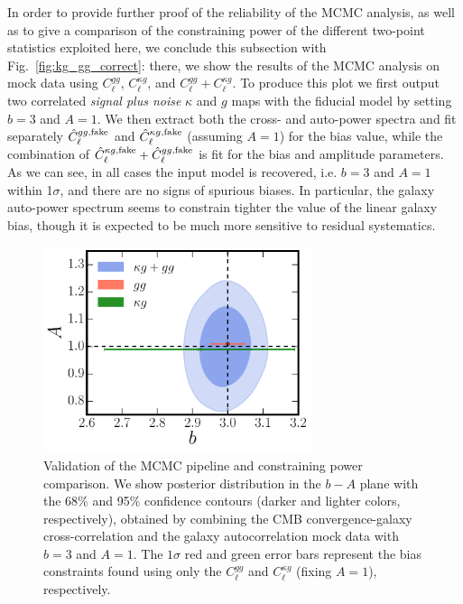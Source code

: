 In order to provide further proof of the reliability of the MCMC analysis, as well as to give a comparison of the constraining power of the different two-point statistics exploited here, we conclude this subsection with Fig.~\eqref{fig:kg_gg_correct}: there, we show the results of the MCMC analysis on mock data using $C_{\ell}^{gg}$, $C_{\ell}^{\kappa g}$, and $C_{\ell}^{gg} + C_{\ell}^{\kappa g}$. To produce this plot we first output two correlated \textit{signal plus noise} $\kappa$ and $g$ maps with the fiducial model by setting $b=3$  and $A=1$. We then extract both the cross- and auto-power spectra and fit separately $\hat{C}_{\ell}^{gg, \rm{fake}}$ and $\hat{C}_{\ell}^{\kappa g, \rm{fake}}$ (assuming $A=1$) for the bias value, while the combination of $\hat{C}_{\ell}^{\kappa g, \rm{fake}} + \hat{C}_{\ell}^{gg, \rm{fake}}$ is fit for the bias and amplitude parameters. As we can see, in all cases the input model is recovered, i.e. $b=3$ and $A =1$ within 1$\sigma$, and there are no signs of spurious biases. In particular, the galaxy auto-power spectrum seems to constrain tighter the value of the linear galaxy bias, though it is expected to be much more sensitive to residual systematics.

\begin{figure} %
\centering %
\includegraphics[width=0.7\textwidth]{Chapter3/Images/b_A_correct}
\caption{Validation of the MCMC pipeline and constraining power comparison. We show posterior distribution in the $b-A$ plane with the 68\% and 95\% confidence contours (darker and lighter colors, respectively), obtained by combining the \gls{CMB} convergence-galaxy cross-correlation and the galaxy autocorrelation mock data with $b=3$ and $A=1$. The $1\sigma$ red and green error bars represent the bias constraints found using only the $C_{\ell}^{gg}$ and $C_{\ell}^{\kappa g}$ (fixing $A=1$), respectively. \label{fig:kg_gg_correct}}
\end{figure}


